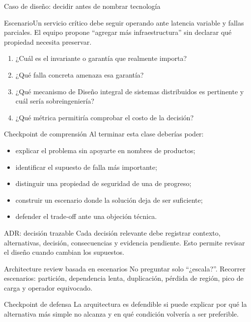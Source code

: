 \documentclass[institutional,screen,none]{ua-engineering-v6-beamer}
\begin{document}
\begin{frame}{Caso de diseño: decidir antes de nombrar tecnología}
\small
\begin{block}{Escenario}Un servicio crítico debe seguir operando ante latencia variable y fallas parciales. El equipo propone ``agregar más infraestructura'' sin declarar qué propiedad necesita preservar.\end{block}
\begin{enumerate}
\item ¿Cuál es el invariante o garantía que realmente importa?
\item ¿Qué falla concreta amenaza esa garantía?
\item ¿Qué mecanismo de Diseño integral de sistemas distribuidos es pertinente y cuál sería sobreingeniería?
\item ¿Qué métrica permitiría comprobar el costo de la decisión?
\end{enumerate}
\end{frame}
\begin{frame}{Checkpoint de comprensión}
\small
Al terminar esta clase deberías poder:
\begin{itemize}
\item explicar el problema sin apoyarte en nombres de productos;
\item identificar el supuesto de falla más importante;
\item distinguir una propiedad de seguridad de una de progreso;
\item construir un escenario donde la solución deja de ser suficiente;
\item defender el trade-off ante una objeción técnica.
\end{itemize}
\end{frame}

\begin{frame}{ADR: decisión trazable}
Cada decisión relevante debe registrar contexto, alternativas, decisión, consecuencias y evidencia pendiente. Esto permite revisar el diseño cuando cambian los supuestos.
\end{frame}
\begin{frame}{Architecture review basada en escenarios}
No preguntar solo ``¿escala?''. Recorrer escenarios: partición, dependencia lenta, duplicación, pérdida de región, pico de carga y operador equivocado.
\end{frame}
\begin{frame}{Checkpoint de defensa}
La arquitectura es defendible si puede explicar por qué la alternativa más simple no alcanza y en qué condición volvería a ser preferible.
\end{frame}
\end{document}
